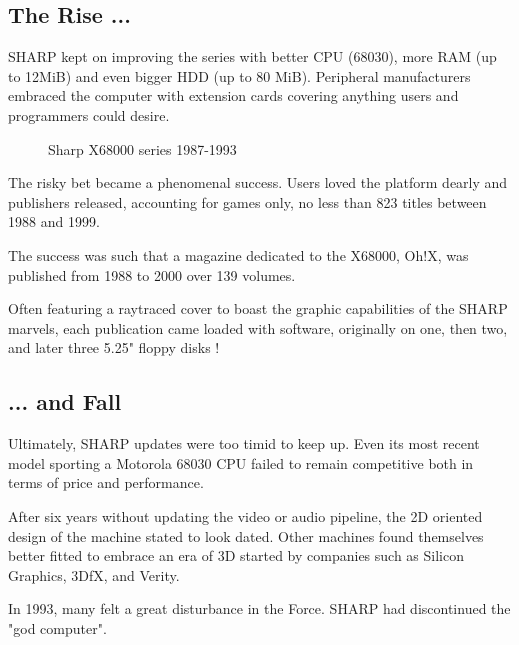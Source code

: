 \subsection{The Rise ...}
 SHARP kept on improving the series with better CPU (68030), more RAM (up to 12MiB) and even bigger HDD (up to 80 MiB). Peripheral manufacturers embraced the computer with extension cards covering anything users and programmers could desire. 


\begin{figure}[H]
\caption*{Sharp X68000 series 1987-1993}
\end{figure}






 The risky bet became a phenomenal success. Users loved the platform dearly and publishers released, accounting for games only, no less than 823 titles between 1988 and 1999.


\begin{trivia}
The success was such that a magazine dedicated to the X68000, Oh!X, was published from 1988 to 2000 over 139 volumes. 

\begin{minipage}[t]{0.32\linewidth}
\end{minipage}%
\hfill
\begin{minipage}[t]{0.32\linewidth}
\end{minipage}%
\hfill
\begin{minipage}[t]{0.322\linewidth}
\end{minipage}%

Often featuring a raytraced cover to boast the graphic capabilities of the SHARP marvels, each publication came loaded with software, originally on one, then two, and later three 5.25" floppy disks \cite{ohXarticle}!
\end{trivia}

\subsection{... and Fall}
Ultimately, SHARP updates were too timid to keep up. Even its most recent model sporting a Motorola 68030 CPU failed to remain competitive both in terms of price and performance.

After six years without updating the video or audio pipeline, the 2D oriented design of the machine stated to look dated. Other machines found themselves better fitted to embrace an era of 3D started by companies such as Silicon Graphics, 3DfX, and Verity.

In 1993, many felt a great disturbance in the Force. SHARP had discontinued the "god computer".

